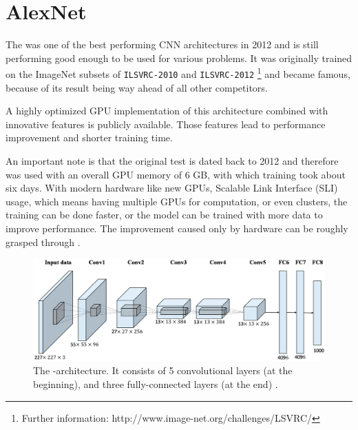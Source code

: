 \section{AlexNet} \label{sec: AlexNet}

The \textit{\alexnet} was one of the best performing CNN architectures in 2012 and is still performing good enough to be used for various problems. It was originally trained on the ImageNet subsets of \texttt{ILSVRC-2010} and \texttt{ILSVRC-2012} \footnote{Further information: http://www.image-net.org/challenges/LSVRC/} and became famous, because of its result being way ahead of all other competitors.

A highly optimized GPU implementation of this architecture combined with innovative features is publicly available. Those features lead to performance improvement and shorter training time.\cite{krizhevsky2012imagenet}

An important note is that the original test is dated back to 2012 and therefore was used with an overall GPU memory of 6 GB, with which training took about six days. With modern hardware like new GPUs, Scalable Link Interface (SLI) usage, which means having multiple GPUs for computation, or even clusters, the training can be done faster, or the model can be trained with more data to improve performance. The improvement caused only by hardware can be roughly grasped through \cite{sze2017hardware}.


\begin{figure}[ht]
	\centering
	\includegraphics[scale = 1.3]{src/pic/AlexNet-structure-simple.PNG}
	\caption{The \alexnet-architecture. It consists of 5 convolutional layers (at the beginning), and three fully-connected layers (at the end) \cite{han2017pre}
	\cite{krizhevsky2012imagenet}.}
	\label{pic: AlexNet}
\end{figure}